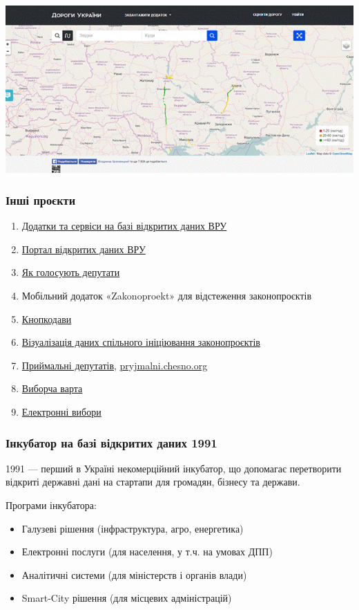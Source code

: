 \includegraphics{images/031.gif}

\subsubsection{Інші проєкти}

\begin{enumerate}
    \item \href{http://data.rada.gov.ua/open/main/apps}{Додатки та сервіси на базі відкритих даних ВРУ}
    \item \href{http://opendata.rada.gov.ua/}{Портал відкритих даних ВРУ}
    \item \href{http://rada4you.org}{Як голосують депутати}
    \item Мобільний додаток «Zakonoproekt» для відстеження законопроєктів
    \item \href{http://knopkodavy.chesno.org/}{Кнопкодави}
    \item \href{http://groups.chesno.org/}{Візуалізація даних спільного ініціювання законопроєктів}
    \item \href{https://rada.oporaua.org/map/}{Приймальні депутатів}, \href{https://pryjmalni.chesno.org}{pryjmalni.chesno.org}
    \item \href{http://openvote.in.ua/}{Виборча варта}
    \item \href{https://e-vybory.org/}{Електронні вибори}
\end{enumerate}

\subsubsection{Інкубатор на базі відкритих даних 1991}

1991 — перший в Україні некомерційний інкубатор, що допомагає перетворити відкриті державні дані на стартапи для громадян, бізнесу та держави.

Програми інкубатора:
\begin{itemize}
    \item Галузеві рішення (інфраструктура, агро, енергетика)
    \item Електронні послуги (для населення, у т.ч. на умовах ДПП)
    \item Аналітичні системи (для міністерств і органів влади)
    \item Smart-City рішення (для місцевих адміністрацій)
\end{itemize}
